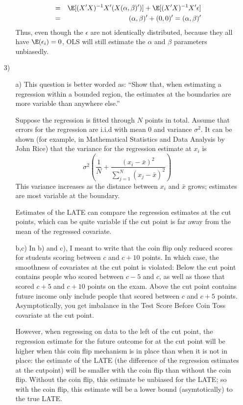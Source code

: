 \documentclass{article}
\begin{document}
\begin{itemize}
\begin{itemize}
\begin{eqnarray*}
       &=& \E[(X'X)^{-1}X'(X(\alpha, \beta)')] +\E[(X'X)^{-1}X'\epsilon] \\
       & = & (\alpha,\beta)' + (0,0)' = (\alpha,\beta)'  
     \end{eqnarray*}
     Thus, even though the $\epsilon$ are not identically distributed, 
     because they all have $\E(\epsilon_i) = 0$, OLS will still 
     estimate the $\alpha$ and $\beta$ parameters unbiasedly.
  \end{itemize}
  \item[3)]
  \begin{itemize}
    \item[a)]  This question is better worded as:
      ``Show that, when estimating a regression within a bounded region,
        the estimates at the boundaries are more variable than anywhere else.''
       
       Suppose the regression is fitted through $N$ points in total.
       Assume that errors for the regression are i.i.d with mean 0 and
       variance $\sigma^2$.
       It can be shown 
       (for example, in Mathematical Statistics and Data Analysis by John Rice) 
       that the variance for the regression estimate at $x_i$ is
       $$
         \sigma^2\left(\frac 1 N + \frac {(x_i - \bar x)^2}{\sum_{j=1}^N (x_j - \bar x)^2}\right)
       $$
       This variance increases as the distance between $x_i$ and $\bar x$ grows;
       estimates are most variable at the boundary.
       
       Estimates of the LATE can compare the regression estimates at the cut points, 
       which can be quite variable if the cut point is far away from the mean of the 
       regressed covariate.
     \item[b,c)] In b) and c), I meant to write that the coin flip only reduced scores for
       students scoring between $c$ and $c + 10$ points.  
       In which case, the smoothness of covariates at the cut point is violated:
       Below the cut point contains people who scored between
       $c-5$ and $c$, as well as those that scored $c+5$ and $c+10$ points on
       the exam.  
       Above the cut point contains future income only include people that scored 
       between $c$ and $c+5$ points.
       Asymptotically, you get imbalance in the Test Score Before Coin Toss covariate 
       at the cut point.
       
       However, when regressing on data to the left of the cut point, 
       the regression estimate for the future outcome for at the cut point will be higher
       when this coin flip mechanism is in place than when it is not in place:
       the estimate of the LATE (the difference of the regression estimates at the cutpoint)
       will be smaller with the coin flip than without the coin flip.
       Without the coin flip, this estimate be unbiased for the LATE; 
       so with the coin flip, this estimate will be a lower bound (asymtotically) to 
       the true LATE.
       

\end{itemize}
\end{itemize}
\end{document}
